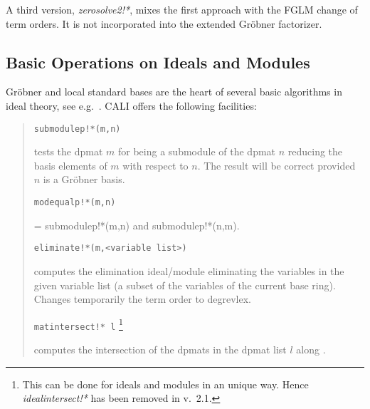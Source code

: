 \documentclass[a4paper,11pt]{article}
\newcommand{\gr}{Gr\"obner}
\newcommand{\ind}[1]{{\em #1}\index{#1}}
\newcommand{\pbx}[1]{\mbox{}\hfill \parbox[t]{12cm}{#1} \pagebreak[3]}
\begin{document}
A third version, \ind{zerosolve2!*}, mixes the first approach with the
FGLM change of term orders. It is not incorporated into the extended
{\gr} factorizer.

\subsection{Basic Operations on Ideals and Modules}

{\gr} and local standard bases are the heart of several basic
algorithms in ideal theory, see e.g.\ \cite[6.2.]{BKW}. CALI offers
the following facilities:
\begin{quote}
\verb|submodulep!*(m,n)|

\pbx{tests the dpmat $m$ for being a submodule of the dpmat $n$
reducing the basis elements of $m$ with respect to $n$. The result
will be correct provided $n$ is a {\gr} basis.}

\verb|modequalp!*(m,n)|

\pbx{ = submodulep!*(m,n) and submodulep!*(n,m).}

\verb|eliminate!*(m,<variable list>)| 

\pbx{computes the elimination ideal/module eliminating the variables
in the given variable list (a subset of the variables of the current
base ring). Changes temporarily the term order to degrevlex.}

\verb|matintersect!* l|
\footnote{This can be done for ideals and
modules in an unique way. Hence {\em idealintersect!*} has been
removed in v.\ 2.1.}

\pbx{computes the intersection of the dpmats in the dpmat list $l$
along \cite[6.20]{BKW}.}
\end{quote}
\end{document}
